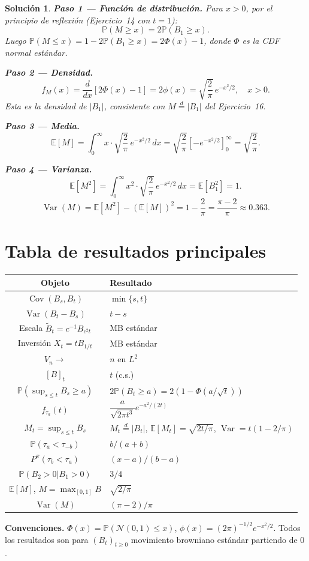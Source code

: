 \documentclass[12pt,letterpaper]{article}
\theoremstyle{ejercicio}
\theoremstyle{solucion}
\newtheorem*{solucion}{Solución}
\newcommand{\E}{\mathbb{E}}
\newcommand{\Var}{\operatorname{Var}}
\newcommand{\Cov}{\operatorname{Cov}}
\newcommand{\dto}{\overset{d}{=}}
\renewcommand{\P}{\mathbb{P}}
\begin{document}
\begin{solucion}

\textbf{Paso 1 — Función de distribución.}
Para $x>0$, por el principio de reflexión (Ejercicio~14 con $t=1$):
\[
  \P(M\ge x) = 2\P(B_1\ge x).
\]
Luego $\P(M\le x) = 1-2\P(B_1\ge x) = 2\Phi(x)-1$, donde $\Phi$ es la CDF normal estándar.

\textbf{Paso 2 — Densidad.}
\[
  f_M(x) = \frac{d}{dx}[2\Phi(x)-1] = 2\phi(x) = \sqrt{\frac{2}{\pi}}\,e^{-x^2/2},
  \quad x>0.
\]
Esta es la densidad de $|B_1|$, consistente con $M\dto|B_1|$ del Ejercicio~16.

\textbf{Paso 3 — Media.}
\[
  \E[M] = \int_0^\infty x\cdot\sqrt{\frac{2}{\pi}}\,e^{-x^2/2}\,dx
  = \sqrt{\frac{2}{\pi}}\left[-e^{-x^2/2}\right]_0^\infty
  = \sqrt{\frac{2}{\pi}}.
\]

\textbf{Paso 4 — Varianza.}
\[
  \E[M^2] = \int_0^\infty x^2\cdot\sqrt{\frac{2}{\pi}}\,e^{-x^2/2}\,dx
  = \E[B_1^2] = 1.
\]
\[
  \Var(M) = \E[M^2]-(\E[M])^2 = 1-\frac{2}{\pi} = \frac{\pi-2}{\pi}\approx 0.363.
\]
\end{solucion}

\newpage
\appendix
\section*{Tabla de resultados principales}

\begin{center}
\renewcommand{\arraystretch}{1.6}
\begin{tabular}{|c|l|}
\hline
\textbf{Objeto} & \textbf{Resultado} \\
\hline
$\Cov(B_s,B_t)$ & $\min\{s,t\}$ \\
$\Var(B_t-B_s)$ & $t-s$ \\
Escala $\tilde B_t=c^{-1}B_{c^2t}$ & MB estándar \\
Inversión $X_t=tB_{1/t}$ & MB estándar \\
$V_n\to$ & $n$ en $L^2$ \\
$[B]_t$ & $t$ (c.s.) \\
$\P(\sup_{s\le t}B_s\ge a)$ & $2\P(B_t\ge a)=2(1-\Phi(a/\sqrt{t}))$ \\
$f_{\tau_a}(t)$ & $\dfrac{a}{\sqrt{2\pi t^3}}e^{-a^2/(2t)}$ \\
$M_t=\sup_{s\le t}B_s$ & $M_t\dto|B_t|$, $\E[M_t]=\sqrt{2t/\pi}$, $\Var=t(1-2/\pi)$ \\
$\P(\tau_a<\tau_{-b})$ & $b/(a+b)$ \\
$P^x(\tau_b<\tau_a)$ & $(x-a)/(b-a)$ \\
$\P(B_2>0|B_1>0)$ & $3/4$ \\
$\E[M]$, $M=\max_{[0,1]}B$ & $\sqrt{2/\pi}$ \\
$\Var(M)$ & $(\pi-2)/\pi$ \\
\hline
\end{tabular}
\end{center}

\bigskip
\noindent\textbf{Convenciones.} $\Phi(x)=\P(\mathcal{N}(0,1)\le x)$,
$\phi(x)=(2\pi)^{-1/2}e^{-x^2/2}$.
Todos los resultados son para $(B_t)_{t\ge 0}$ movimiento browniano estándar partiendo de $0$.
\end{document}
